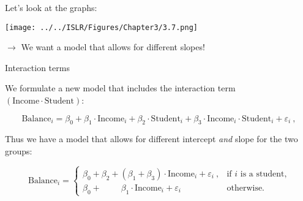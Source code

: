 \documentclass[10pt,ignorenonframetext,]{beamer}
\begin{document}
\begin{frame}

Let's look at the graphs:

\texttt{[image: ../../ISLR/Figures/Chapter3/3.7.png]}

\(\rightarrow\) We want a model that allows for different slopes!

\end{frame}

\begin{frame}

\begin{block}{Interaction terms}

\vspace{2mm}

We formulate a new model that includes the interaction term
\((\text{Income}\cdot \text{Student})\):

\[\text{Balance}_i = \beta_0 + \beta_1 \cdot \text{Income}_i + \beta_2 \cdot \text{Student}_i + \beta_3 \cdot \text{Income}_i \cdot \text{Student}_i  + \varepsilon_i \ ,\]

Thus we have a model that allows for different intercept \emph{and}
slope for the two groups:

\begin{equation*}
\text{Balance}_i = \left\{ 
\begin{array}{ll}
\beta_0 + \beta_2 + (\beta_1 + \beta_3) \cdot \text{Income}_i  + \varepsilon_i \ ,  & \text{if $i$ is a student,}\\
\beta_0 + \qquad \; \beta_1 \cdot \text{Income}_i  + \varepsilon_i  & \text{otherwise.}
\end{array}
\right.
\end{equation*}

\end{block}

\end{frame}
\end{document}
